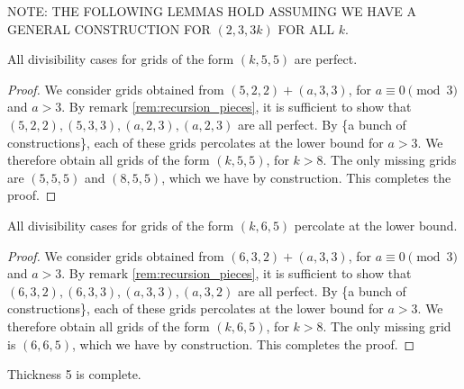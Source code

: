NOTE: THE FOLLOWING LEMMAS HOLD ASSUMING WE HAVE A GENERAL CONSTRUCTION FOR $(2,3,3k)$ FOR ALL $k$.
\begin{lem}
\label{lem:width_5}
All divisibility cases for grids of the form $(k,5,5)$ are perfect.
\end{lem}

\begin{proof}
We consider grids obtained from $(5,2,2) + (a,3,3)$, for $a \equiv 0 \pmod 3$ and $a >3$. By remark \ref{rem:recursion_pieces}, it is sufficient to show that $(5,2,2), (5,3,3), (a,2,3), (a,2,3)$ are all perfect. By \{a bunch of constructions\}, each of these grids percolates at the lower bound for $a>3$. We therefore obtain all grids of the form $(k,5,5)$, for $k>8$. The only missing grids are $(5,5,5)$ and $(8,5,5)$, which we have by construction. This completes the proof. 
\end{proof}

\begin{lem}
\label{lem:width_6}
All divisibility cases for grids of the form $(k,6,5)$ percolate at the lower bound.
\end{lem}

\begin{proof}
We consider grids obtained from $(6,3,2) + (a,3,3)$, for $a \equiv 0 \pmod 3$ and $a >3$. By remark \ref{rem:recursion_pieces}, it is sufficient to show that $(6,3,2), (6,3,3), (a,3,3), (a,3,2)$ are all perfect. By \{a bunch of constructions\}, each of these grids percolates at the lower bound for $a>3$. We therefore obtain all grids of the form $(k,6,5)$, for $k>8$. The only missing grid is $(6,6,5)$, which we have by construction. This completes the proof. 
\end{proof}

\begin{lem}
\label{lem:thickness_5_complete}
Thickness 5 is complete.
\end{lem}

